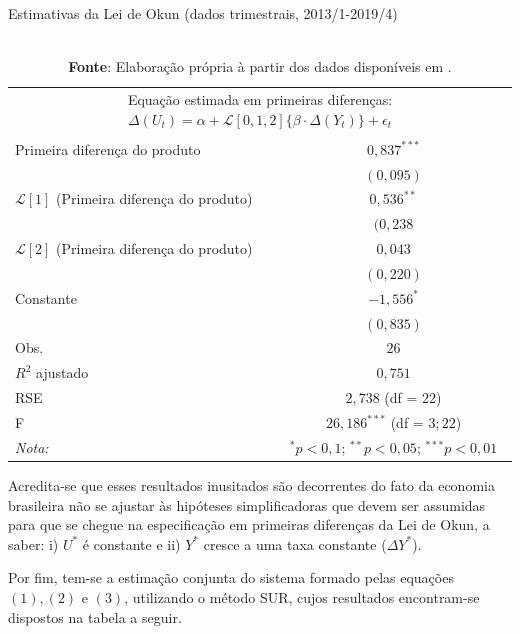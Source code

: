 \documentclass[12pt, openright,oneside, a4paper, english, brazil, section = TITLE, ubsection = Title]{article}
\begin{document}
\begin{table}[H]
\centering
\caption{Estimativas da Lei de Okun (dados trimestrais, 2013/1-2019/4)}
\label{tab:okun_diferenças}
\begin{tabular}{lc} \\ \multicolumn{2}{c}{Equação estimada em primeiras diferenças: $\Delta(U_t) = \alpha +  \mathcal{L}[0,1,2]\{\beta \cdot \Delta(Y_t)\}  + \epsilon_t$} \\\\ \toprule
Primeira diferença do produto & $0,837^{***}$ \\
 & $(0,095)$ \\
$\mathcal{L}[1]$ (Primeira diferença do produto) & $0,536^{**}$  \\ & $(0,238$  \\ 
$\mathcal{L}[2]$ (Primeira diferença do produto) & $0,043$ \\ & $(0,220)$  \\ Constante & $-1,556^{*}$ \\ & $(0,835)$ \\
Obs. & $26$ \\
$R^2$ ajustado & $0,751$ \\
RSE & $2,738$ (df = $22$) \\ F & $26,186^{***}$ (df = $3;22$) \\ \bottomrule
\textit{Nota:} & $^*p < 0,1$; $^{**}p < 0,05$; $^{***}p < 0,01$
\end{tabular}
\caption*{\\ \textbf{Fonte}: Elaboração própria à partir dos dados disponíveis em \cite{IPEA2020}.}
\end{table}

Acredita-se que esses resultados inusitados são decorrentes do fato da economia brasileira não se ajustar às hipóteses simplificadoras que devem ser assumidas para que se chegue na especificação em primeiras diferenças da Lei de Okun, a saber: i) $U^*$ é constante e ii) $Y^*$ cresce a uma taxa constante ($\Delta Y^*$).

Por fim, tem-se a estimação conjunta do sistema formado pelas equações $(1), (2)$ e $(3)$, utilizando o método SUR, cujos resultados encontram-se dispostos na tabela a seguir.
\end{document}
